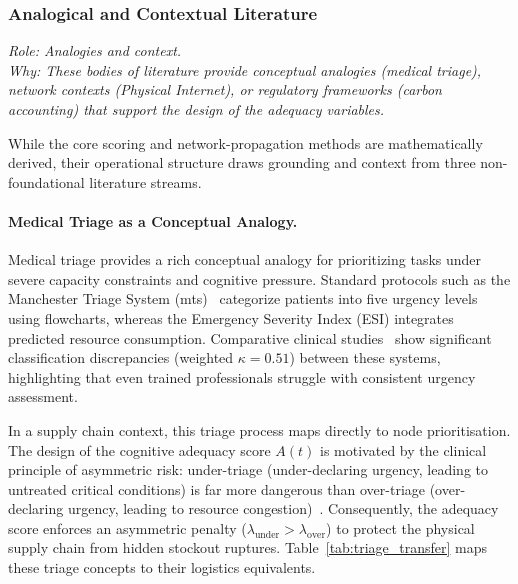 \subsubsection{Analogical and Contextual Literature}
\label{subsec:triage}

\noindent\textit{Role: Analogies and context. \\ Why: These bodies of literature provide conceptual analogies (medical triage), network contexts (Physical Internet), or regulatory frameworks (carbon accounting) that support the design of the adequacy variables.}

\medskip

While the core scoring and network-propagation methods are mathematically derived, their operational structure draws grounding and context from three non-foundational literature streams.

\paragraph{Medical Triage as a Conceptual Analogy.}
Medical triage provides a rich conceptual analogy for prioritizing tasks under severe capacity constraints and cognitive pressure. Standard protocols such as the Manchester Triage System (\gls{mts})~\autocite{mackway2013emergency} categorize patients into five urgency levels using flowcharts, whereas the Emergency Severity Index (ESI) integrates predicted resource consumption. Comparative clinical studies~\autocite{kuligowski2025comparative} show significant classification discrepancies (weighted $\kappa = 0.51$) between these systems, highlighting that even trained professionals struggle with consistent urgency assessment.

In a supply chain context, this triage process maps directly to node prioritisation. The design of the cognitive adequacy score $A(t)$ is motivated by the clinical principle of asymmetric risk: under-triage (under-declaring urgency, leading to untreated critical conditions) is far more dangerous than over-triage (over-declaring urgency, leading to resource congestion)~\autocite{kim2020admission}. Consequently, the adequacy score enforces an asymmetric penalty ($\lambda_{\text{under}} > \lambda_{\text{over}}$) to protect the physical supply chain from hidden stockout ruptures. Table~\ref{tab:triage_transfer} maps these triage concepts to their logistics equivalents.

